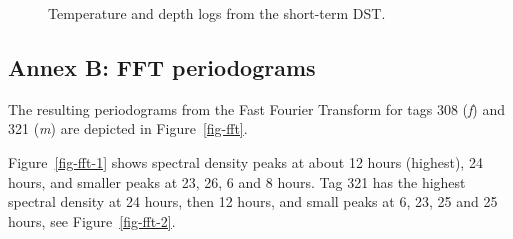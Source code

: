 \documentclass[
  authoryear,
  review,
  3p]{elsarticle}
\begin{document}
\begin{figure}
\begin{minipage}[t]{0.50\linewidth}
{\centering 


}

\end{minipage}%
%
\begin{minipage}[t]{0.50\linewidth}

{\centering 


}

\end{minipage}%

\caption{\label{fig-dstannex}Temperature and depth logs from the
short-term DST.}

\end{figure}

\hypertarget{annex-b-fft-periodograms}{%
\subsection*{\texorpdfstring{\textbf{Annex B}: FFT
periodograms}{Annex B: FFT periodograms}}\label{annex-b-fft-periodograms}}

The resulting periodograms from the Fast Fourier Transform for tags 308
(\emph{f}) and 321 (\emph{m}) are depicted in Figure~\ref{fig-fft}.

Figure~\ref{fig-fft-1} shows spectral density peaks at about 12 hours
(highest), 24 hours, and smaller peaks at 23, 26, 6 and 8 hours. Tag 321
has the highest spectral density at 24 hours, then 12 hours, and small
peaks at 6, 23, 25 and 25 hours, see Figure~\ref{fig-fft-2}.
\end{document}
